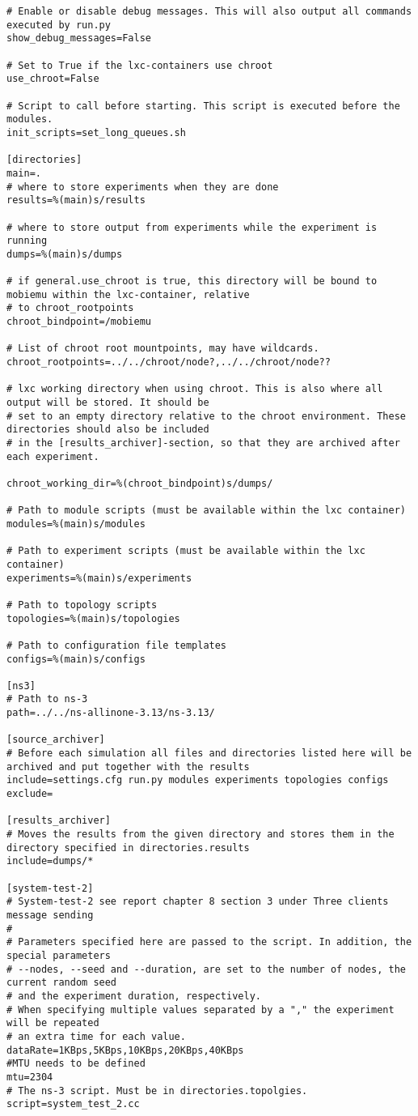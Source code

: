 \begin{lstlisting}[frame=single, caption={Setting.cfg}, label=mobiemu:setting.cfg, breaklines=true]
# Enable or disable debug messages. This will also output all commands executed by run.py
show_debug_messages=False

# Set to True if the lxc-containers use chroot
use_chroot=False

# Script to call before starting. This script is executed before the modules.
init_scripts=set_long_queues.sh

[directories]
main=.
# where to store experiments when they are done
results=%(main)s/results

# where to store output from experiments while the experiment is running
dumps=%(main)s/dumps

# if general.use_chroot is true, this directory will be bound to mobiemu within the lxc-container, relative
# to chroot_rootpoints
chroot_bindpoint=/mobiemu

# List of chroot root mountpoints, may have wildcards.
chroot_rootpoints=../../chroot/node?,../../chroot/node??

# lxc working directory when using chroot. This is also where all output will be stored. It should be
# set to an empty directory relative to the chroot environment. These directories should also be included
# in the [results_archiver]-section, so that they are archived after each experiment.

chroot_working_dir=%(chroot_bindpoint)s/dumps/

# Path to module scripts (must be available within the lxc container)
modules=%(main)s/modules

# Path to experiment scripts (must be available within the lxc container)
experiments=%(main)s/experiments

# Path to topology scripts
topologies=%(main)s/topologies

# Path to configuration file templates
configs=%(main)s/configs

[ns3]
# Path to ns-3
path=../../ns-allinone-3.13/ns-3.13/

[source_archiver]
# Before each simulation all files and directories listed here will be archived and put together with the results
include=settings.cfg run.py modules experiments topologies configs
exclude=

[results_archiver]
# Moves the results from the given directory and stores them in the directory specified in directories.results
include=dumps/*

[system-test-2]
# System-test-2 see report chapter 8 section 3 under Three clients message sending
#
# Parameters specified here are passed to the script. In addition, the special parameters
# --nodes, --seed and --duration, are set to the number of nodes, the current random seed
# and the experiment duration, respectively.
# When specifying multiple values separated by a "," the experiment will be repeated
# an extra time for each value.
dataRate=1KBps,5KBps,10KBps,20KBps,40KBps
#MTU needs to be defined
mtu=2304
# The ns-3 script. Must be in directories.topolgies.
script=system_test_2.cc


\end{lstlisting}
